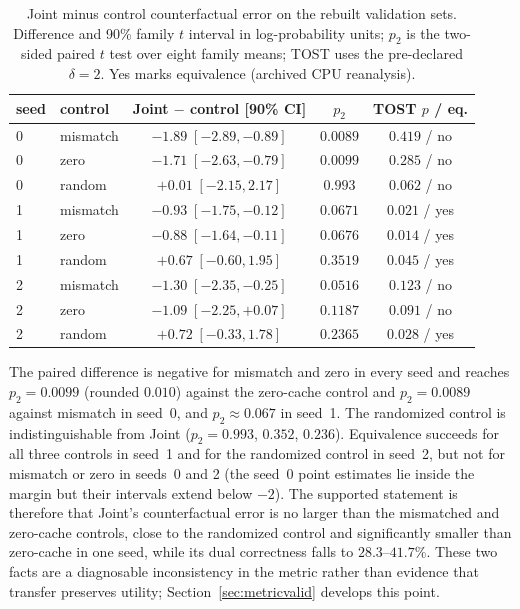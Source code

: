 \documentclass[11pt,twocolumn]{article}
\begin{document}
\begin{table}[t]
\centering
\caption{Joint minus control counterfactual error on the rebuilt validation
sets. Difference and 90\% family $t$ interval in log-probability units; $p_2$
is the two-sided paired $t$ test over eight family means; TOST uses the
pre-declared $\delta=2$. Yes marks equivalence (archived CPU reanalysis).}
\label{tab:control-test}
\begin{tabular}{llccc}
\toprule
seed & control & Joint $-$ control [90\% CI] & $p_2$ & TOST $p$ / eq. \\
\midrule
0 & mismatch & $-1.89\;[-2.89,-0.89]$ & $0.0089$ & $0.419$ / no \\
0 & zero & $-1.71\;[-2.63,-0.79]$ & $0.0099$ & $0.285$ / no \\
0 & random & $+0.01\;[-2.15,2.17]$ & $0.993$ & $0.062$ / no \\
1 & mismatch & $-0.93\;[-1.75,-0.12]$ & $0.0671$ & $0.021$ / yes \\
1 & zero & $-0.88\;[-1.64,-0.11]$ & $0.0676$ & $0.014$ / yes \\
1 & random & $+0.67\;[-0.60,1.95]$ & $0.3519$ & $0.045$ / yes \\
2 & mismatch & $-1.30\;[-2.35,-0.25]$ & $0.0516$ & $0.123$ / no \\
2 & zero & $-1.09\;[-2.25,+0.07]$ & $0.1187$ & $0.091$ / no \\
2 & random & $+0.72\;[-0.33,1.78]$ & $0.2365$ & $0.028$ / yes \\
\bottomrule
\end{tabular}
\end{table}

The paired difference is negative for mismatch and zero in every seed and
reaches $p_2=0.0099$ (rounded $0.010$) against the zero-cache control and
$p_2=0.0089$ against mismatch in seed~0, and $p_2\approx0.067$ in seed~1. The
randomized control is indistinguishable from Joint ($p_2=0.993$, $0.352$,
$0.236$). Equivalence succeeds for all three controls in seed~1 and for the
randomized control in seed~2, but not for mismatch or zero in seeds~0 and 2
(the seed~0 point estimates lie inside the margin but their intervals extend
below $-2$). The supported statement is therefore that Joint's counterfactual
error is no larger than the mismatched and zero-cache controls, close to the
randomized control and significantly smaller than zero-cache in one seed, while
its dual correctness falls to $28.3$--$41.7\%$. These two
facts are a diagnosable inconsistency in the metric rather than evidence that
transfer preserves utility; Section~\ref{sec:metricvalid} develops this point.
\end{document}
